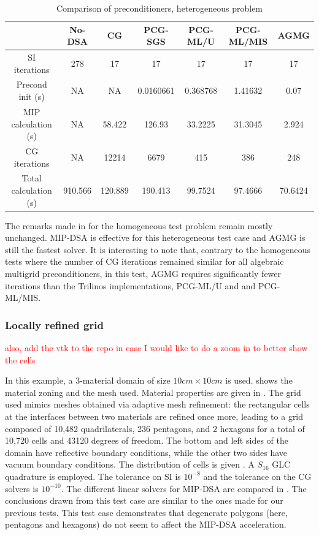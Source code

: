 %
%
\begin{table}[!htbp]
  \begin{center}
    \caption{Comparison of preconditioners, heterogeneous problem}
    \begin{tabular}{|c|c|c|c|c|c|c|}
      \hline
      & No-DSA & CG & PCG-SGS & PCG-ML/U & PCG-ML/MIS & AGMG\\
      \hline
      SI iterations & 278     & 17      & 17        & 17       & 17      & 17  \\
   Precond init (s) & NA      & NA      & 0.0160661 & 0.368768 & 1.41632 &
      0.07  \\
MIP calculation (s) & NA      & 58.422  & 126.93    & 33.2225  & 31.3045 &
      2.924 \\
      CG iterations & NA      & 12214   & 6679      & 415      & 386     & 248  \\
Total calculation (s) & 910.566 & 120.889 & 190.413 & 99.7524  & 97.4666 &
      70.6424 \\      
      \hline
    \end{tabular}
    \label{comparison_hex}
  \end{center}
\end{table}
%
The remarks made in  for the homogeneous test problem
remain mostly unchanged. MIP-DSA is effective for this heterogeneous test case and AGMG is
still the fastest solver. It is interesting to note that, contrary to the
homogeneous tests where the number of CG iterations remained similar for all
algebraic multigrid preconditioners, in this test, AGMG requires
significantly fewer iterations than the Trilinos implementations, PCG-ML/U and and PCG-ML/MIS.

\subsubsection{Locally refined grid}

\textcolor{red}{also, add the vtk to the repo in case I would like to do a zoom in to better show the cells}

In this example, a 3-material domain of size $10cm\times 10cm$ is used. 
 shows the material zoning and the mesh used. Material properties 
are given in . The grid used mimics meshes obtained via adaptive mesh
refinement: the rectangular cells at the interfaces between two materials are refined once more,
leading to a grid composed of 10,482 quadrilaterals, 236 pentagons,
and 2 hexagons for a total of 10,720 cells and 43120 degrees of freedom. The bottom
and left sides of the domain have reflective boundary conditions, while the other two sides
have vacuum boundary conditions. 
%
The distribution of cells is given .
A $S_{16}$ GLC quadrature is employed. The tolerance on SI is $10^{-8}$ and
the tolerance on the CG solvers is $10^{-10}$.
The different linear solvers for MIP-DSA are compared in .
%
The conclusions drawn from this test case are similar to the ones made for 
our previous tests. This test case demonstrates that degenerate polygons 
(here, pentagons and hexagons) do not seem to affect the MIP-DSA acceleration.

